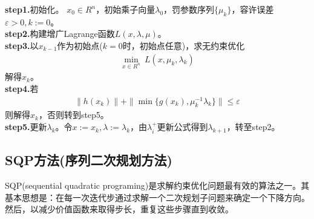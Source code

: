         \textbf{step1.}初始化。
        $x_0 \in R^n$，初始乘子向量${\lambda}_0$，罚参数序列$\{{\mu}_k\}$，容许误差$\varepsilon > 0,k:=0$。\\
        \textbf{step2.}构建增广Lagrange函数$L(x,\lambda,\mu)$。\\
        \textbf{step3.}以$x_{k-1}$作为初始点($k=0$时，初始点任意)，求无约束优化
        \begin{align*}
         \mathop {\min}\limits_{x \in R^n}\ L(x,{\mu}_k,{\lambda}_k)
        \end{align*}
        解得$x_k$。\\
        \textbf{step4.}若
        \begin{align*}
         \|h(x_k)\|+\|{\min}\{g(x_k),{\mu}_k^{-1}{\lambda}_k\}\| \leqslant \varepsilon
        \end{align*}
        则解得$x_k$，否则转到step5。\\
        \textbf{step5.}更新${\lambda}_k$。令$x:=x_k,\lambda:={\lambda}_k$，由${\lambda}_i^+ $更新公式得到${\lambda}_{k+1}$，转至step2。
    \subsection{SQP方法(序列二次规划方法)}
        \par
        SQP(sequential quadratic programing)是求解约束优化问题最有效的算法之一。其基本思想是：在每一次迭代步通过求解一个二次规划子问题来确定一个下降方向。然后，以减少价值函数来取得步长，重复这些步骤直到收敛。
